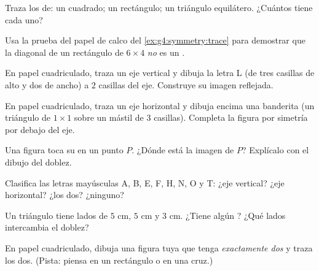 \begin{exercise}[$\star$]\label{exo:g4:symmetry:2}
Traza los  de: un cuadrado; un rectángulo; un triángulo
equilátero. ¿Cuántos tiene cada uno?
\end{exercise}

\begin{exercise}[$\star$]\label{exo:g4:symmetry:3}
Usa la prueba del papel de calco del \cref{ex:g4:symmetry:trace} para demostrar
que la diagonal de un rectángulo de $6 \times 4$ \emph{no} es un .
\end{exercise}

\begin{exercise}[$\star$]\label{exo:g4:symmetry:4}
En papel cuadriculado, traza un eje vertical y dibuja la letra L (de tres casillas
de alto y dos de ancho) a $2$ casillas del eje. Construye su imagen
reflejada.
\end{exercise}

\begin{exercise}[$\star$]\label{exo:g4:symmetry:5}
En papel cuadriculado, traza un eje horizontal y dibuja encima una banderita (un triángulo
de $1 \times 1$ sobre un mástil de $3$ casillas). Completa la figura por
simetría por debajo del eje.
\end{exercise}

\begin{exercise}[$\star$]\label{exo:g4:symmetry:6}
Una figura toca su  en un punto $P$. ¿Dónde está la
imagen de $P$? Explícalo con el dibujo del doblez.
\end{exercise}

\begin{exercise}[$\star$]\label{exo:g4:symmetry:7}
Clasifica las letras mayúsculas A, B, E, F, H, N, O y T: ¿eje vertical?
¿eje horizontal? ¿los dos? ¿ninguno?
\end{exercise}

\begin{exercise}[$\star$]\label{exo:g4:symmetry:8}
Un triángulo tiene lados de $5$ cm, $5$ cm y $3$ cm. ¿Tiene algún
? ¿Qué lados intercambia el doblez?
\end{exercise}

\begin{exercise}[$\star\star$]\label{exo:g4:symmetry:9}
En papel cuadriculado, dibuja una figura tuya que tenga \emph{exactamente dos}
 y traza los dos. (Pista: piensa en un rectángulo
o en una cruz.)
\end{exercise}

